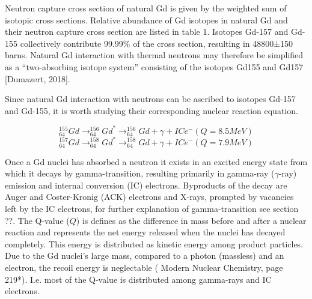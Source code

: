 
Neutron capture cross section of natural Gd is given by the weighted sum of isotopic cross sections. Relative abundance of Gd isotopes in natural Gd and their neutron capture cross section are listed in table 1. Isotopes Gd-157 and Gd-155 collectively contribute 99.99\% of the cross section, resulting in 48800±150 barns. Natural Gd interaction with thermal neutrons may therefore be simplified as a “two-absorbing isotope system” consisting of the isotopes Gd155 and Gd157 [Dumazert, 2018].


Since natural Gd interaction with neutrons can be ascribed to isotopes Gd-157 and Gd-155, it is worth studying their corresponding nuclear reaction equation.

\begin{equation}
    _{64}^{155}Gd \rightarrow _{64}^{156}Gd^* \rightarrow _{64}^{156}Gd + \gamma + ICe^-     (Q=8.5 MeV)
\end{equation}
\begin{equation}
    _{64}^{157}Gd \rightarrow _{64}^{158}Gd^* \rightarrow _{64}^{158}Gd + \gamma + ICe^-    (Q=7.9 MeV)
\end{equation}

Once a Gd nuclei has absorbed a neutron it exists in an excited energy state from which it decays by gamma-transition, resulting primarily in gamma-ray ($\gamma$-ray) emission and internal conversion (IC) electrons. Byproducts of the decay are Auger and Coster-Kronig (ACK) electrons and X-rays, prompted by vacancies left by the IC electrons, for further explanation of gamma-transition see section ??. The Q-value ($Q$) is defines as the difference in mass before and after a nuclear reaction and represents the net energy released when the nuclei has decayed completely. This energy is distributed as kinetic energy among product particles. Due to the Gd nuclei’s large mass, compared to a photon (massless) and an electron, the recoil energy is neglectable ( Modern Nuclear Chemistry, page 219*). I.e. most of the Q-value is distributed among gamma-rays and IC electrons.


